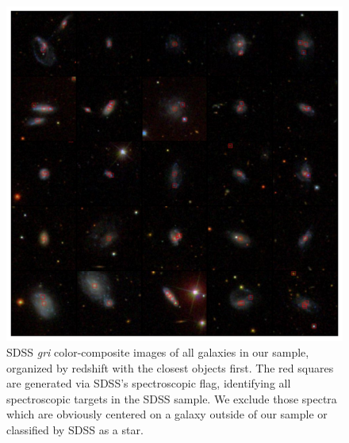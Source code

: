 \begin{figure}
\includegraphics[width=\textwidth]{Figures/display_all_clumpy_jpegs_group0.pdf}
\caption[Visual catalog of SDSS Stripe 82 ``clumpy'' galaxies.]{SDSS \textit{gri} color-composite images of all galaxies in our sample, organized by redshift with the closest objects first. The red squares are generated via SDSS's spectroscopic flag, identifying all spectroscopic targets in the SDSS sample. We exclude those spectra which are obviously centered on a galaxy outside of our sample or classified by SDSS as a star.}
\label{fig: clumpy catalog}
\end{figure}


